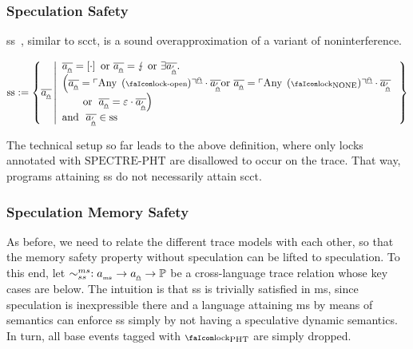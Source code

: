 \documentclass[a4paper,12pt]{article}
\begin{document}
\subsubsection{Speculation Safety}

\gls*{ss}~\cite{patrignani2021exorcising}, similar to \gls*{scct}, is a sound overapproximation of a variant of noninterference.

\begin{definition}{}
  \[
    \sssafe := \left\{
      \specTrace
        \left|
          \begin{array}{l}
            \specTrace=\hole{\cdot} 
              \text{ or } 
            \specTrace=\lightning
              \text{ or }
            \exists\specTrace['].\\
            \left(\specTrace=\specAny[\unlock]\cdot\specTrace['] 
              \text{or }
            \varTrace[_{\mathghost}]=\specAny[\lock_{\text{NONE}}]\cdot\specTrace[']\right.\\
            \hspace{2em}\text{or }
            \left.\varTrace[_{\mathghost}]=\emptyevent\cdot\specTrace[']\right)\\
            \text{and }%
            \ \varTrace[_{\mathghost}']\in\sssafe
          \end{array}
        \right.
      \right\}
  \] 
\end{definition}
The technical setup so far leads to the above definition, where only locks annotated with $\text{SPECTRE-PHT}$ are disallowed to occur on the trace.
That way, programs attaining \gls*{ss} do not necessarily attain \gls*{scct}.

\subsubsection{Speculation Memory Safety}\label{sec:spec-ms-rel}

As before, we need to relate the different trace models with each other, so that the memory safety property without speculation can be lifted to speculation. 
To this end, let $\xlangrel{ms}{ss}: \msEvent \to \specEvent\to\mathbb{P}$ be a cross-language trace relation whose key cases are below.
The intuition is that \gls*{ss} is trivially satisfied in \gls*{ms}, since speculation is inexpressible there and a language attaining \gls*{ms} by means of semantics can enforce \gls*{ss} simply by not having a speculative dynamic semantics. 
In turn, all base events tagged with $\lock_{\text{PHT}}$ are simply dropped. 
\end{document}
